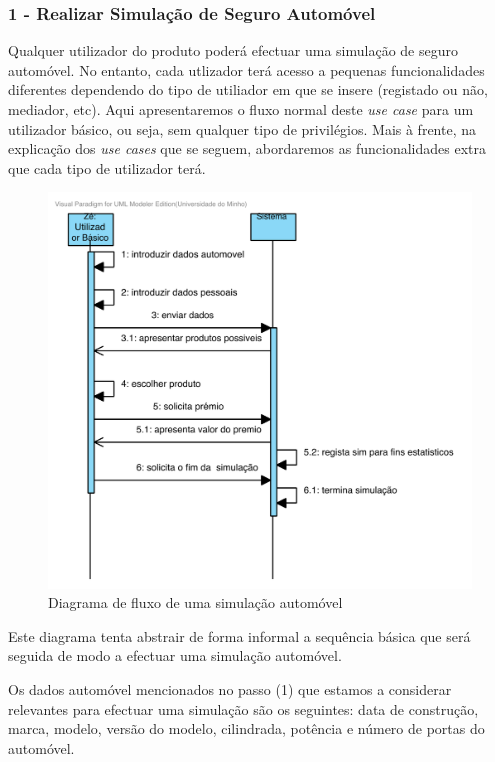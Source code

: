 \subsubsection{\textbf{1 - Realizar Simulação de Seguro Automóvel}}
Qualquer utilizador do produto poderá efectuar uma simulação de seguro automóvel. No entanto, cada utlizador terá acesso a pequenas funcionalidades diferentes dependendo do tipo de utiliador em que se insere (registado ou não, mediador, etc). Aqui apresentaremos o fluxo normal deste \emph{use case} para um utilizador básico, ou seja, sem qualquer tipo de privilégios. Mais à frente, na explicação dos \emph{use cases} que se seguem, abordaremos as funcionalidades extra que cada tipo de utilizador terá. 
\begin{figure}[!htb]
	\centering
	\includegraphics[scale=0.70]{images/simAuto}
	\caption {Diagrama de fluxo de uma simulação automóvel}
\end{figure}
\pagebreak

\noindent Este diagrama tenta abstrair de forma informal a sequência básica que será seguida de modo a efectuar uma simulação automóvel. 

Os dados automóvel mencionados no passo (1) que estamos a considerar relevantes para efectuar uma simulação são os seguintes: data de construção, marca, modelo, versão do modelo, cilindrada, potência e número de portas do automóvel. 

